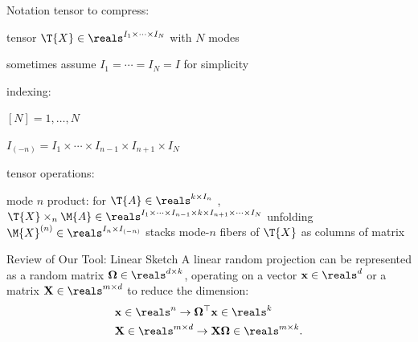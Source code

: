 \documentclass[handout,xcolor={usenames,dvipsnames}]{beamer}
\begin{document}
\begin{frame}{Notation}
tensor to compress:
\bit
\item tensor $\T{X} \in \reals^{I_1 \times \cdots \times I_N}$ with $N$ modes
\item sometimes assume $I_1 = \cdots = I_N = I$ for simplicity
\eit

\pause indexing:
\bit
\item $[N] = 1,\ldots,N$
\item $I_{(-n)} = I_1 \times  \cdots \times  I_{n-1} \times   I_{n+1} \times I_N$
\eit

\pause tensor operations:
\bit
\item mode $n$ product: for $\T{A} \in \reals^{k \times I_n}$ ,
$\T{X} \times_n \M{A} \in \reals^{I_1 \times \cdots \times I_{n-1} \times k \times I_{n+1} \times \cdots \times I_N}$ %
\pitem unfolding $\M{X}^{(n)} \in \reals^{I_n \times I_{(-n)}}$ stacks mode-$n$ fibers of $\T{X}$ as columns of matrix
\eit
\end{frame}

\begin{frame}{Review of Our Tool: Linear Sketch}
A linear random projection can be represented as a random matrix $\mathbf{\Omega}\in \reals^{d\times k}$, operating on a vector $\mathbf{x}\in \reals^{d}$ or a matrix $\mathbf{X} \in \reals^{m\times d}$ to reduce the dimension:
\begin{equation}
\label{eq:low_dim_mapping}
\begin{aligned}
&\mathbf{x} \in \reals^{n} \rightarrow  \mathbf{\Omega}^\top \mathbf{x} \in \reals^{k} \\
& \mathbf{X} \in \reals^{m\times d} \rightarrow   \mathbf{X}\mathbf{\Omega} \in \reals^{m\times k}. 
\end{aligned}
\end{equation}
\end{frame}
\end{document}
